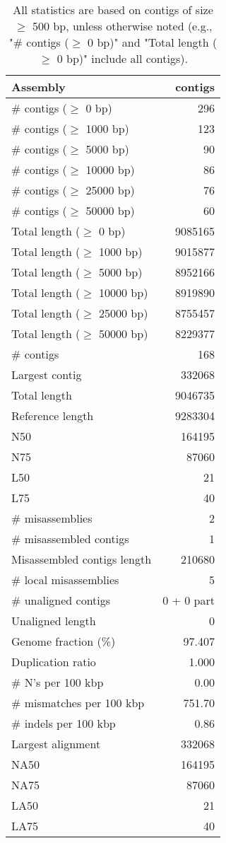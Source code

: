 \documentclass[12pt,a4paper]{article}
\begin{document}
\begin{table}[ht]
\begin{center}
\caption{All statistics are based on contigs of size $\geq$ 500 bp, unless otherwise noted (e.g., "\# contigs ($\geq$ 0 bp)" and "Total length ($\geq$ 0 bp)" include all contigs).}
\begin{tabular}{|l*{1}{|r}|}
\hline
Assembly & contigs \\ \hline
\# contigs ($\geq$ 0 bp) & 296 \\ \hline
\# contigs ($\geq$ 1000 bp) & 123 \\ \hline
\# contigs ($\geq$ 5000 bp) & 90 \\ \hline
\# contigs ($\geq$ 10000 bp) & 86 \\ \hline
\# contigs ($\geq$ 25000 bp) & 76 \\ \hline
\# contigs ($\geq$ 50000 bp) & 60 \\ \hline
Total length ($\geq$ 0 bp) & 9085165 \\ \hline
Total length ($\geq$ 1000 bp) & 9015877 \\ \hline
Total length ($\geq$ 5000 bp) & 8952166 \\ \hline
Total length ($\geq$ 10000 bp) & 8919890 \\ \hline
Total length ($\geq$ 25000 bp) & 8755457 \\ \hline
Total length ($\geq$ 50000 bp) & 8229377 \\ \hline
\# contigs & 168 \\ \hline
Largest contig & 332068 \\ \hline
Total length & 9046735 \\ \hline
Reference length & 9283304 \\ \hline
N50 & 164195 \\ \hline
N75 & 87060 \\ \hline
L50 & 21 \\ \hline
L75 & 40 \\ \hline
\# misassemblies & 2 \\ \hline
\# misassembled contigs & 1 \\ \hline
Misassembled contigs length & 210680 \\ \hline
\# local misassemblies & 5 \\ \hline
\# unaligned contigs & 0 + 0 part \\ \hline
Unaligned length & 0 \\ \hline
Genome fraction (\%) & 97.407 \\ \hline
Duplication ratio & 1.000 \\ \hline
\# N's per 100 kbp & 0.00 \\ \hline
\# mismatches per 100 kbp & 751.70 \\ \hline
\# indels per 100 kbp & 0.86 \\ \hline
Largest alignment & 332068 \\ \hline
NA50 & 164195 \\ \hline
NA75 & 87060 \\ \hline
LA50 & 21 \\ \hline
LA75 & 40 \\ \hline
\end{tabular}
\end{center}
\end{table}
\end{document}
